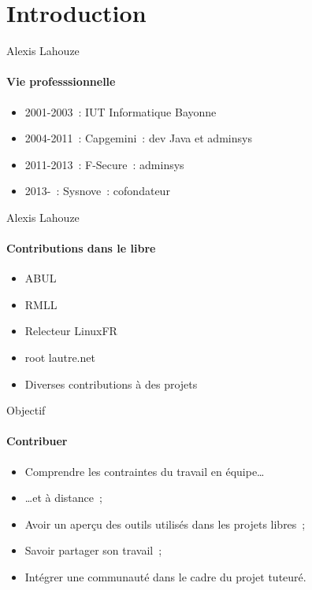 \section{Introduction}
\begin{frame}{Alexis Lahouze}
  \framesubtitle{Vie professsionnelle}

  \begin{itemize}
    \item 2001-2003~: IUT Informatique Bayonne
    \pause
    \item 2004-2011~: Capgemini~: dev Java et adminsys
    \pause
    \item 2011-2013~: F-Secure~: adminsys
    \pause
    \item 2013-~: Sysnove~: cofondateur
  \end{itemize}
\end{frame}

\begin{frame}{Alexis Lahouze}
  \framesubtitle{Contributions dans le libre}

  \begin{itemize}
    \item ABUL
    \pause
    \item RMLL
    \pause
    \item Relecteur LinuxFR
    \pause
    \item root lautre.net
    \pause
    \item Diverses contributions à des projets
  \end{itemize}
\end{frame}

\begin{frame}{Objectif}
  \framesubtitle{Contribuer}

  \begin{itemize}
    \item Comprendre les contraintes du travail en équipe\dots
    \pause
    \item \dots et à distance~;
    \pause
    \item Avoir un aperçu des outils utilisés dans les projets libres~;
    \pause
    \item Savoir partager son travail~;
    \pause
    \item Intégrer une communauté dans le cadre du projet tuteuré.
  \end{itemize}
\end{frame}